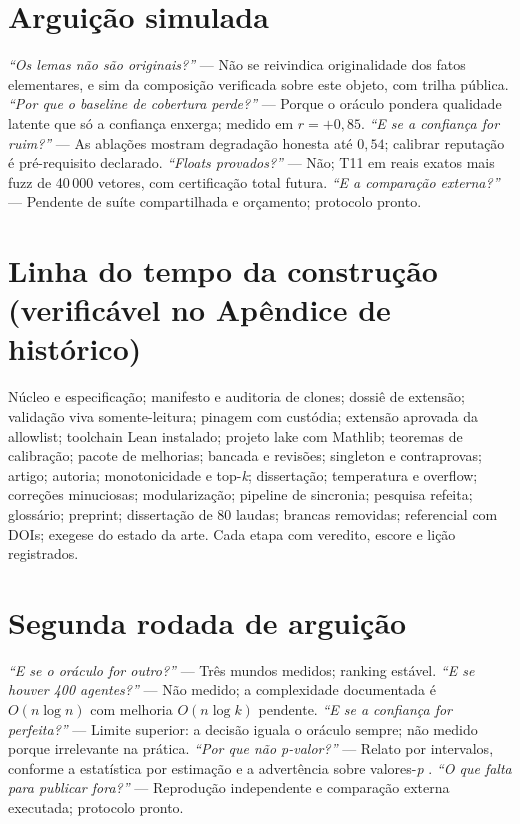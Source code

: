 \section{Arguição simulada}
\textit{``Os lemas não são originais?''} --- Não se reivindica originalidade dos fatos elementares, e sim da composição verificada sobre este objeto, com trilha pública. \textit{``Por que o baseline de cobertura perde?''} --- Porque o oráculo pondera qualidade latente que só a confiança enxerga; medido em $r=+0{,}85$. \textit{``E se a confiança for ruim?''} --- As ablações mostram degradação honesta até $0{,}54$; calibrar reputação é pré-requisito declarado. \textit{``Floats provados?''} --- Não; T11 em reais exatos mais fuzz de 40\,000 vetores, com certificação total futura. \textit{``E a comparação externa?''} --- Pendente de suíte compartilhada e orçamento; protocolo pronto.
\section{Linha do tempo da construção (verificável no Apêndice de histórico)}
Núcleo e especificação; manifesto e auditoria de clones; dossiê de extensão; validação viva somente-leitura; pinagem com custódia; extensão aprovada da allowlist; toolchain Lean instalado; projeto lake com Mathlib; teoremas de calibração; pacote de melhorias; bancada e revisões; singleton e contraprovas; artigo; autoria; monotonicidade e top-\textit{k}; dissertação; temperatura e overflow; correções minuciosas; modularização; pipeline de sincronia; pesquisa refeita; glossário; preprint; dissertação de 80 laudas; brancas removidas; referencial com DOIs; exegese do estado da arte. Cada etapa com veredito, escore e lição registrados.
\section{Segunda rodada de arguição}
\textit{``E se o oráculo for outro?''} --- Três mundos medidos; ranking estável. \textit{``E se houver 400 agentes?''} --- Não medido; a complexidade documentada é $O(n\log n)$ com melhoria $O(n\log k)$ pendente. \textit{``E se a confiança for perfeita?''} --- Limite superior: a decisão iguala o oráculo sempre; não medido porque irrelevante na prática. \textit{``Por que não p-valor?''} --- Relato por intervalos, conforme a estatística por estimação \cite{cumming2014} e a advertência sobre valores-\textit{p} \cite{wasserstein2016}. \textit{``O que falta para publicar fora?''} --- Reprodução independente e comparação externa executada; protocolo pronto.
